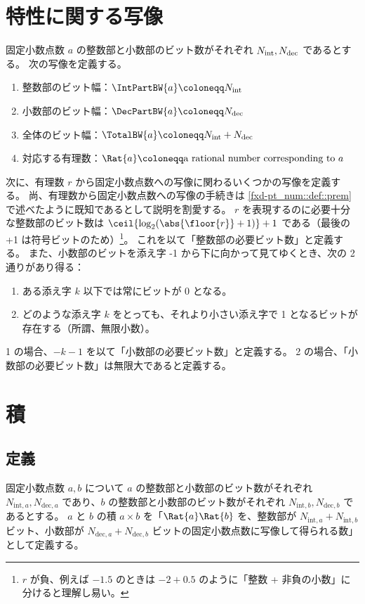     \section{特性に関する写像}
        固定小数点数 $a$ の整数部と小数部のビット数がそれぞれ ${N_\text{int}}, {N_\text{dec}}$ であるとする。
        次の写像を定義する。
        \begin{enumerate}
            \item 整数部のビット幅：$\IntPartBW{a} \coloneqq \Ni$
            \item 小数部のビット幅：$\DecPartBW{a} \coloneqq \Nd$
            \item 全体のビット幅：$\TotalBW{a} \coloneqq \Ni + \Nd$
            \item 対応する有理数：$\Rat{a} \coloneqq \text{a rational number corresponding to }a$
        \end{enumerate}
        次に、有理数 $r$ から固定小数点数への写像に関わるいくつかの写像を定義する。
        尚、有理数から固定小数点数への写像の手続きは \ref{fxd-pt_num::def::prem} で述べたように既知であるとして説明を割愛する。
        $r$ を表現するのに必要十分な整数部のビット数は $\ceil{\log_2(\abs{\floor{r}}+1)}+1$ である（最後の +1 は符号ビットのため）\footnote{$r$ が負、例えば $-1.5$ のときは $-2+0.5$ のように「整数 + 非負の小数」に分けると理解し易い。}。
        これを以て「整数部の必要ビット数」と定義する。
        また、小数部のビットを添え字 -1 から下に向かって見てゆくとき、次の 2 通りがあり得る：
        \begin{enumerate}
            \item ある添え字 $k$ 以下では常にビットが 0 となる。
            \item どのような添え字 $k$ をとっても、それより小さい添え字で 1 となるビットが存在する（所謂、無限小数）。
        \end{enumerate}
        1 の場合、$-k-1$ を以て「小数部の必要ビット数」と定義する。
        2 の場合、「小数部の必要ビット数」は無限大であると定義する。
    \section{積}
        \newcommand{\Nia}{{N_{\text{int},a}}}
        \newcommand{\Nda}{{N_{\text{dec},a}}}
        \newcommand{\Nib}{{N_{\text{int},b}}}
        \newcommand{\Ndb}{{N_{\text{dec},b}}}
        \subsection{定義}
            固定小数点数 $a, b$ について $a$ の整数部と小数部のビット数がそれぞれ $\Nia, \Nda$ であり、$b$ の整数部と小数部のビット数がそれぞれ $\Nib, \Ndb$ であるとする。
            $a$ と $b$ の積 $a\times b$ を「$\Rat{a}\Rat{b}$ を、整数部が $\Nia+\Nib$ ビット、小数部が $\Nda+\Ndb$ ビットの固定小数点数に写像して得られる数」として定義する。
            \par
